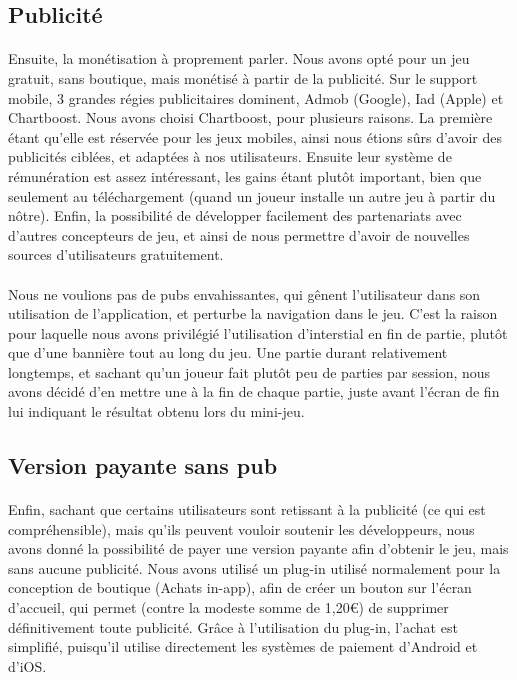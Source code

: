 \subsection{Publicité}

\paragraph{}Ensuite, la monétisation à proprement parler. Nous avons opté pour un jeu gratuit, sans boutique, mais monétisé à partir de la publicité. Sur le support mobile, 3 grandes régies publicitaires dominent, Admob (Google), Iad (Apple) et Chartboost. Nous avons choisi Chartboost, pour plusieurs raisons. La première étant qu'elle est réservée pour les jeux mobiles, ainsi nous étions sûrs d'avoir des publicités ciblées, et adaptées à nos utilisateurs. Ensuite leur système de rémunération est assez intéressant, les gains étant plutôt important, bien que seulement au téléchargement (quand un joueur installe un autre jeu à partir du nôtre). Enfin, la possibilité de développer facilement des partenariats avec d'autres concepteurs de jeu, et ainsi de nous permettre d'avoir de nouvelles sources d'utilisateurs gratuitement. 
\paragraph{}
Nous ne voulions pas de pubs envahissantes, qui gênent l'utilisateur dans son utilisation de l'application, et perturbe la navigation dans le jeu. C'est la raison pour laquelle nous avons privilégié l'utilisation d'interstial en fin de partie, plutôt que d'une bannière tout au long du jeu. Une partie durant relativement longtemps, et sachant qu'un joueur fait plutôt peu de parties par session, nous avons décidé d'en mettre une à la fin de chaque partie, juste avant l'écran de fin lui indiquant le résultat obtenu lors du mini-jeu.

\subsection{Version payante sans pub}

\paragraph{}
Enfin, sachant que certains utilisateurs sont retissant à la publicité (ce qui est compréhensible), mais qu'ils peuvent vouloir soutenir les développeurs, nous avons donné la possibilité de payer une version payante afin d'obtenir le jeu, mais sans aucune publicité. Nous avons utilisé un plug-in utilisé normalement pour la conception de boutique (Achats in-app), afin de créer un bouton sur l'écran d'accueil, qui permet (contre la modeste somme de 1,20\euro) de supprimer définitivement toute publicité. Grâce à l'utilisation du plug-in, l'achat est simplifié, puisqu'il utilise directement les systèmes de paiement d'Android et d'iOS.  
